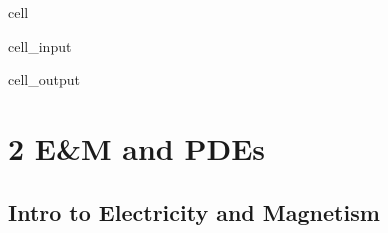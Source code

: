 \documentclass[letterpaper,10pt,english]{jupyterBook}
\begin{document}
\begin{sphinxuseclass}{cell}
\begin{sphinxVerbatimInput}
\begin{sphinxuseclass}{cell_input}
\begin{sphinxVerbatim}[commandchars=\\\{\}]
\PYG{p}{[}\PYG{p}{]}
\PYG{p}{[}\PYG{p}{]}
\end{sphinxVerbatim}

\end{sphinxuseclass}\end{sphinxVerbatimInput}
\begin{sphinxVerbatimOutput}

\begin{sphinxuseclass}{cell_output}
\noindent{}

\noindent{}

\end{sphinxuseclass}\end{sphinxVerbatimOutput}

\end{sphinxuseclass}
\sphinxstepscope


\part{2 \sphinxhyphen{} E\&M and PDEs}

\sphinxstepscope


\chapter{Intro to Electricity and Magnetism}
\label{\detokenize{content/2_EM/EM_intro:intro-to-electricity-and-magnetism}}\label{\detokenize{content/2_EM/EM_intro::doc}}
\sphinxstepscope
\end{document}
